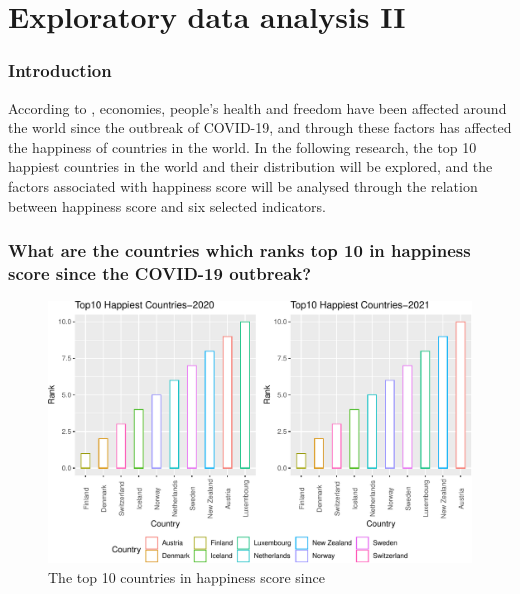 \documentclass[11pt,a4paper,]{article}
\begin{document}
\hypertarget{exploratory-data-analysis-ii}{%
\section{Exploratory data analysis II}\label{exploratory-data-analysis-ii}}

\hypertarget{introduction-1}{%
\subsubsection{Introduction}\label{introduction-1}}

According to \textcite{helliwell2021world}, economies, people's health and freedom have been affected around the world since the outbreak of COVID-19, and through these factors has affected the happiness of countries in the world. In the following research, the top 10 happiest countries in the world and their distribution will be explored, and the factors associated with happiness score will be analysed through the relation between happiness score and six selected indicators.

\hypertarget{what-are-the-countries-which-ranks-top-10-in-happiness-score-since-the-covid-19-outbreak}{%
\subsubsection{What are the countries which ranks top 10 in happiness score since the COVID-19 outbreak?}\label{what-are-the-countries-which-ranks-top-10-in-happiness-score-since-the-covid-19-outbreak}}

\begin{figure}
\centering
\includegraphics{Assignment4_files/figure-latex/top10-1.pdf}
\caption{\label{fig:top10}The top 10 countries in happiness score since}
\end{figure}
\end{document}
